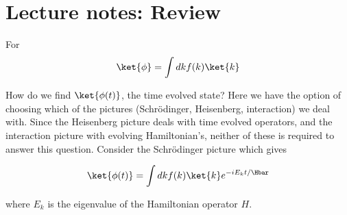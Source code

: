 %
%
\section{Lecture notes: Review}

For
\begin{equation}\label{eqn:lecture5BigReviewCh3Dynamical:20}
\begin{aligned}
\ket{\phi} = \int dk f(k) \ket{k}
\end{aligned}
\end{equation}

How do we find $\ket{\phi(t)}$, the time evolved state?  Here we have the option of choosing which of the pictures (Schr\"{o}dinger, Heisenberg, interaction) we deal with.  Since the Heisenberg picture deals with time evolved operators, and the interaction picture with evolving Hamiltonian's, neither of these is required to answer this question.  Consider the Schr\"{o}dinger picture which gives

\begin{equation}\label{eqn:lecture5BigReviewCh3Dynamical:40}
\begin{aligned}
\ket{\phi(t)} = \int dk f(k) \ket{k} e^{-i E_k t/\Hbar}
\end{aligned}
\end{equation}

where $E_k$ is the eigenvalue of the Hamiltonian operator $H$.


